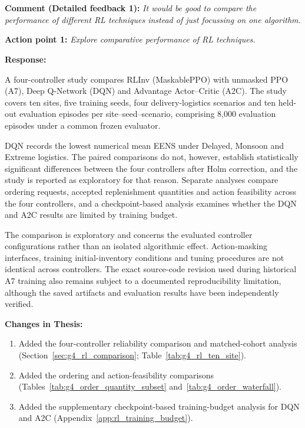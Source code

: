 \section{}
\label{sec:rebuttal_rl_comparison}

\noindent\textbf{Comment (Detailed feedback 1):} \textit{It would be good to
compare the performance of different RL techniques instead of just focussing on
one algorithm.}

\noindent\textbf{Action point 1:} \textit{Explore comparative performance of RL
techniques.}

\vspace{\baselineskip}

\noindent\textbf{Response:}

A four-controller study compares RLInv (MaskablePPO) with unmasked PPO (A7),
Deep Q-Network (DQN) and Advantage Actor--Critic (A2C). The study covers ten
sites, five training seeds, four delivery-logistics scenarios and ten held-out
evaluation episodes per site--seed--scenario, comprising 8,000 evaluation
episodes under a common frozen evaluator.

DQN records the lowest numerical mean EENS under Delayed, Monsoon and Extreme
logistics. The paired comparisons do not, however, establish statistically
significant differences between the four controllers after Holm correction, and
the study is reported as exploratory for that reason. Separate analyses compare
ordering requests, accepted replenishment quantities and action feasibility
across the four controllers, and a checkpoint-based analysis examines whether
the DQN and A2C results are limited by training budget.

The comparison is exploratory and concerns the evaluated controller
configurations rather than an isolated algorithmic effect. Action-masking
interfaces, training initial-inventory conditions and tuning procedures
are not identical across controllers. The exact source-code revision used during
historical A7 training also remains subject
to a documented reproducibility limitation,
although the saved artifacts and evaluation
results have been independently verified.

\vspace{\baselineskip}

\noindent\textbf{Changes in Thesis:}
\begin{enumerate}
  \item Added the four-controller reliability comparison and matched-cohort
        analysis (Section~\ref{sec:g4_rl_comparison};
        Table~\ref{tab:g4_rl_ten_site}).
  \item Added the ordering and action-feasibility comparisons
        (Tables~\ref{tab:g4_order_quantity_subset}
        and~\ref{tab:g4_order_waterfall}).
  \item Added the supplementary checkpoint-based training-budget analysis for
        DQN and A2C (Appendix~\ref{app:rl_training_budget}).
\end{enumerate}


